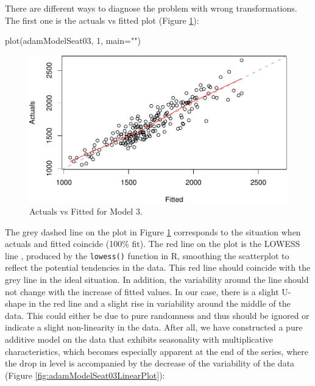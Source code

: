 \documentclass[
]{book}
\newenvironment{Shaded}{\begin{snugshade}}{\end{snugshade}}
\newcommand{\AttributeTok}[1]{\textcolor[rgb]{0.77,0.63,0.00}{#1}}
\newcommand{\DecValTok}[1]{\textcolor[rgb]{0.00,0.00,0.81}{#1}}
\newcommand{\FunctionTok}[1]{\textcolor[rgb]{0.00,0.00,0.00}{#1}}
\newcommand{\NormalTok}[1]{#1}
\newcommand{\StringTok}[1]{\textcolor[rgb]{0.31,0.60,0.02}{#1}}
\theoremstyle{definition}
\theoremstyle{definition}
\theoremstyle{definition}
\theoremstyle{definition}
\theoremstyle{remark}
\begin{document}
There are different ways to diagnose the problem with wrong transformations. The first one is the actuals vs fitted plot (Figure \ref{fig:adamModelSeat03ActualsFitted}):

\begin{Shaded}
\begin{Highlighting}[]
\FunctionTok{plot}\NormalTok{(adamModelSeat03, }\DecValTok{1}\NormalTok{, }\AttributeTok{main=}\StringTok{""}\NormalTok{)}
\end{Highlighting}
\end{Shaded}

\begin{figure}
\centering
\includegraphics{Svetunkov--2022----ADAM_files/figure-latex/adamModelSeat03ActualsFitted-1.pdf}
\caption{\label{fig:adamModelSeat03ActualsFitted}Actuals vs Fitted for Model 3.}
\end{figure}

The grey dashed line on the plot in Figure \ref{fig:adamModelSeat03ActualsFitted} corresponds to the situation when actuals and fitted coincide (100\% fit). The red line on the plot is the LOWESS line \citep{Cleveland1979}, produced by the \texttt{lowess()} function in R, smoothing the scatterplot to reflect the potential tendencies in the data. This red line should coincide with the grey line in the ideal situation. In addition, the variability around the line should not change with the increase of fitted values. In our case, there is a slight U-shape in the red line and a slight rise in variability around the middle of the data. This could either be due to pure randomness and thus should be ignored or indicate a slight non-linearity in the data. After all, we have constructed a pure additive model on the data that exhibits seasonality with multiplicative characteristics, which becomes especially apparent at the end of the series, where the drop in level is accompanied by the decrease of the variability of the data (Figure \ref{fig:adamModelSeat03LinearPlot}):
\end{document}
